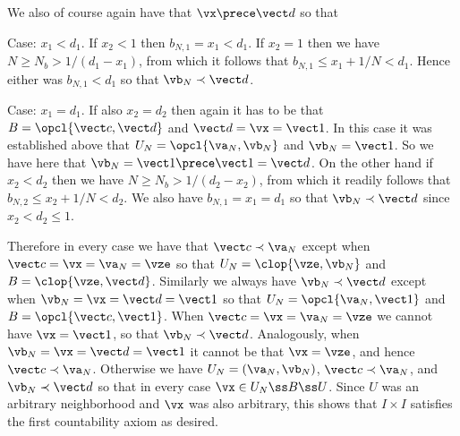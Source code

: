 {{    We also of course again have that $\vx \prece \vd$ so that

    Case: $x_1 < d_1$.
    If $x_2 < 1$ then $b_{N,1} = x_1 < d_1$.
    If $x_2 = 1$ then we have $N \geq N_b > 1/(d_1-x_1)$, from which it follows that $b_{N,1} \leq x_1 + 1/N < d_1$.
    Hence either was $b_{N,1} < d_1$ so that $\vb_N \prec \vd$.

    Case: $x_1 = d_1$.
    If also $x_2 = d_2$ then again it has to be that $B = \opcl{\vc, \vd}$ and $\vd = \vx = \vone$.
    In this case it was established above that $U_N = \opcl{\va_N, \vb_N}$ and $\vb_N = \vone$.
    So we have here that $\vb_N = \vone \prece \vone = \vd$.
    On the other hand if $x_2 < d_2$ then we have $N \geq N_b > 1/(d_2-x_2)$, from which it readily follows that $b_{N,2} \leq x_2+1/N < d_2$.
    We also have $b_{N,1} = x_1 = d_1$ so that $\vb_N \prec \vd$ since $x_2 < d_2 \leq 1$.

    Therefore in every case we have that $\vc \prec \va_N$ except when $\vc = \vx = \va_N = \vze$ so that $U_N = \clop{\vze, \vb_N}$ and $B = \clop{\vze, \vd}$.
    Similarly we always have $\vb_N \prec \vd$ except when $\vb_N = \vx = \vd = \vone$ so that $U_N = \opcl{\va_N, \vone}$ and $B = \opcl{\vc, \vone}$.
    When $\vc = \vx = \va_N = \vze$ we cannot have $\vx = \vone$, so that $\vb_N \prec \vd$.
    Analogously, when $\vb_N = \vx = \vd = \vone$ it cannot be that $\vx = \vze$, and hence $\vc \prec \va_N$.
    Otherwise we have $U_N = (\va_N, \vb_N)$, $\vc \prec \va_N$, and $\vb_N \prec \vd$ so that in every case $\vx \in U_N \ss B \ss U$.
    Since $U$ was an arbitrary neighborhood and $\vx$ was also arbitrary, this shows that $I \times I$ satisfies the first countability axiom as desired.
  }
}

